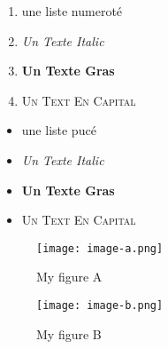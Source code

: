 \vspace{.3cm}


\begin{minipage}{.48\linewidth}
    \begin{enumerate}
        \item une liste numeroté
        \item \textit{Un Texte Italic}
        \item \textbf{Un Texte Gras}
        \item \textsc{Un Text En Capital}
    \end{enumerate}    
\end{minipage}\hfill
\begin{minipage}{.48\linewidth}
    \begin{itemize}
        \item une liste pucé
        \item \textit{Un Texte Italic}
        \item \textbf{Un Texte Gras}
        \item \textsc{Un Text En Capital}
    \end{itemize}
\end{minipage}

\vspace{.3cm}

\begin{figure}[!h]
    \centering
    \begin{minipage}{.48\linewidth}
        \begin{center}
            \texttt{[image: image-a.png]}
            \caption{\label{fig:MyfigureA}My figure A}  
        \end{center}
    \end{minipage}\hfill
    \begin{minipage}{.48\linewidth}
        \begin{center}
            \texttt{[image: image-b.png]}
            \caption{\label{fig:MyfigureB}My figure B}  
        \end{center}
    \end{minipage}
\end{figure}

\vspace{.3cm}

